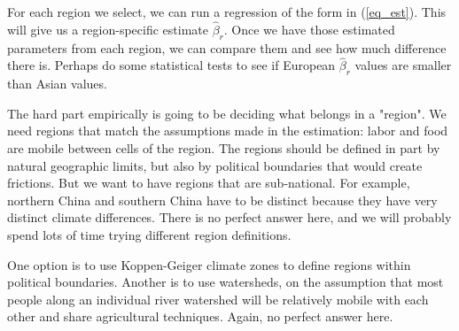 \documentclass[10pt]{article}
\begin{document}
For each region we select, we can run a regression of the form in (\ref{eq_est}). This will give us a region-specific estimate $\hat{\beta}_r$. Once we have those estimated parameters from each region, we can compare them and see how much difference there is. Perhaps do some statistical tests to see if European $\hat{\beta}_r$ values are smaller than Asian values. 

The hard part empirically is going to be deciding what belongs in a "region". We need regions that match the assumptions made in the estimation: labor and food are mobile between cells of the region. The regions should be defined in part by natural geographic limits, but also by political boundaries that would create frictions. But we want to have regions that are sub-national. For example, northern China and southern China have to be distinct because they have very distinct climate differences. There is no perfect answer here, and we will probably spend lots of time trying different region definitions. 

One option is to use Koppen-Geiger climate zones to define regions within political boundaries. Another is to use watersheds, on the assumption that most people along an individual river watershed will be relatively mobile with each other and share agricultural techniques. Again, no perfect answer here.
\end{document}
